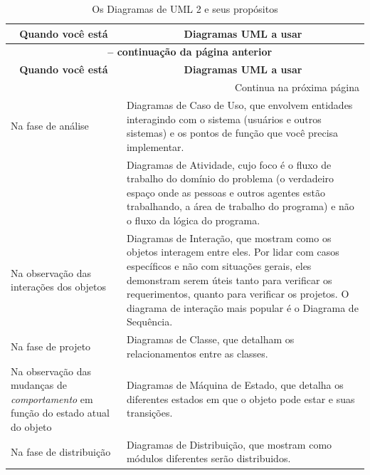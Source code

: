 \documentclass[
	11pt,				%
	openright,
	twoside,			%
	a4paper,			%
	english,			%
	french,
	brazil,				%
	sumario=tradicional
	]{abntex2}
\begin{document}
\begin{longtable}[l]{p{4.9cm}p{11cm}}
\caption{Os Diagramas de UML 2 e seus propósitos} \label{tab:useUML}\\

\multicolumn{1}{c}{\textbf{Quando você está}} & \multicolumn{1}{c}{\textbf{Diagramas UML a usar}} \\
\midrule
\endfirsthead

\multicolumn{2}{c}{{\bfseries \tablename\ \thetable{} -- continuação da página anterior}} \\
\multicolumn{1}{c}{\textbf{Quando você está}} & \multicolumn{1}{c}{\textbf{Diagramas UML a usar}} \\
\midrule
\endhead

\multicolumn{2}{r}{{Continua na próxima página}} \\%
\endfoot

\hline %
\endlastfoot

Na fase de análise & Diagramas de Caso de Uso, que envolvem entidades interagindo com o sistema (usuários e outros sistemas) e os pontos de função que você precisa implementar.\\

 & Diagramas de Atividade, cujo foco é o fluxo de trabalho do domínio do problema (o verdadeiro espaço onde as pessoas e outros agentes estão trabalhando, a área de trabalho do programa) e não o fluxo da lógica do programa.\\[0.3cm]
 
Na observação das interações dos objetos & Diagramas de Interação, que mostram como os objetos interagem entre eles. Por lidar com casos específicos e não com situações gerais, eles demonstram serem úteis tanto para verificar os requerimentos, quanto para verificar os projetos. O diagrama de interação mais popular é o Diagrama de Sequência. \\[0.3cm]

Na fase de projeto & Diagramas de Classe, que detalham os relacionamentos entre as classes.\\[0.3cm]

Na observação das mudanças de \textit{comportamento} em função do estado atual do objeto & Diagramas de Máquina de Estado, que detalha os diferentes estados em que o objeto pode estar e suas transições.\\[0.6cm]

Na fase de distribuição & Diagramas de Distribuição, que mostram como módulos diferentes serão distribuidos.

\end{longtable}
\end{document}
